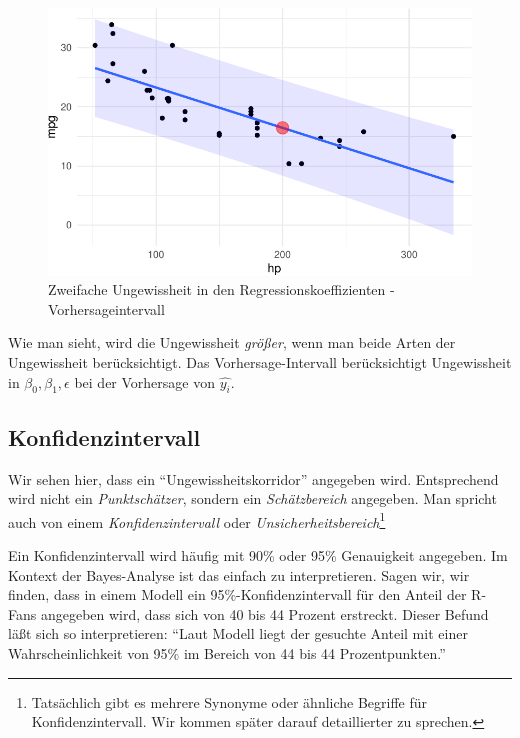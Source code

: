 \documentclass[
  a4paper,
  DIV=11]{scrreprt}
\theoremstyle{definition}
\theoremstyle{remark}
\begin{document}
\begin{figure}

{\centering \includegraphics{./Inferenz_files/figure-pdf/fig-ungewiss2-1.pdf}

}

\caption{\label{fig-ungewiss2}Zweifache Ungewissheit in den
Regressionskoeffizienten - Vorhersageintervall}

\end{figure}

Wie man sieht, wird die Ungewissheit \emph{größer}, wenn man beide Arten
der Ungewissheit berücksichtigt. Das Vorhersage-Intervall berücksichtigt
Ungewissheit in \(\beta_0, \beta_1, \epsilon\) bei der Vorhersage von
\(\hat{y_i}\).

\hypertarget{konfidenzintervall}{%
\subsection{Konfidenzintervall}\label{konfidenzintervall}}

Wir sehen hier, dass ein ``Ungewissheitskorridor'' angegeben wird.
Entsprechend wird nicht ein \emph{Punktschätzer}, sondern ein
\emph{Schätzbereich} angegeben. Man spricht auch von einem
\emph{Konfidenzintervall} oder \emph{Unsicherheitsbereich}\footnote{Tatsächlich
  gibt es mehrere Synonyme oder ähnliche Begriffe für
  Konfidenzintervall. Wir kommen später darauf detaillierter zu
  sprechen.}

Ein Konfidenzintervall wird häufig mit 90\% oder 95\% Genauigkeit
angegeben. Im Kontext der Bayes-Analyse ist das einfach zu
interpretieren. Sagen wir, wir finden, dass in einem Modell ein
95\%-Konfidenzintervall für den Anteil der R-Fans angegeben wird, dass
sich von 40 bis 44 Prozent erstreckt. Dieser Befund läßt sich so
interpretieren: ``Laut Modell liegt der gesuchte Anteil mit einer
Wahrscheinlichkeit von 95\% im Bereich von 44 bis 44 Prozentpunkten.''
\end{document}
